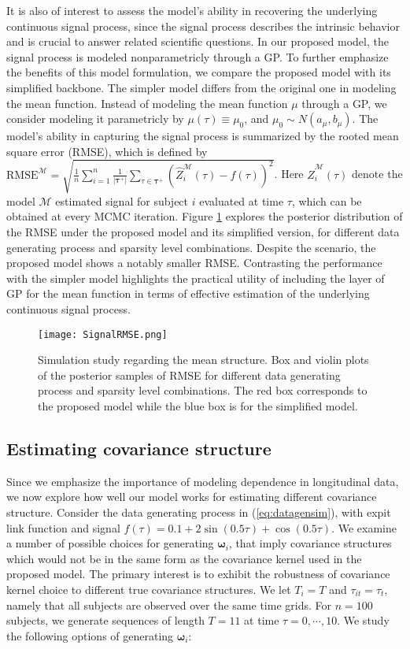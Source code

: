 It is also of interest to assess the model's ability in recovering the underlying continuous signal process, since the signal process describes the intrinsic behavior and is crucial to answer related scientific questions.  
In our proposed model, the signal process is modeled nonparametricly through a GP. To further emphasize the benefits of this model formulation, we compare the proposed model with its simplified backbone. The simpler model differs from the original one in modeling the mean function. Instead of modeling the mean function $\mu$ through a GP, we consider modeling it parametricly by $\mu(\tau)\equiv\mu_0$, and $\mu_0\sim N(a_{\mu},b_{\mu})$. The model's ability in capturing the signal process is summarized by the rooted mean square error (RMSE), which is defined by $\text{RMSE}^{\mathcal{M}}=\sqrt{\frac{1}{n}\sum_{i=1}^n\frac{1}{|\boldsymbol{\tau}^+|}\sum_{\tau\in\boldsymbol{\tau}^+}(\hat{Z}^{\mathcal{M}}_i(\tau)-f(\tau))^2}$. Here $\hat{Z}^{\mathcal{M}}_i(\tau)$ denote the model $\mathcal{M}$ estimated signal for subject $i$ evaluated at time $\tau$, which can be obtained at every MCMC iteration. Figure \ref{fig:signalRMSE} explores the posterior distribution of the RMSE under the proposed model and its simplified version, for different data generating process and sparsity level combinations. Despite the scenario, the proposed model shows a notably smaller RMSE. Contrasting the performance with the simpler model highlights the practical utility of including the layer of GP for the mean function in terms of effective estimation of the underlying continuous signal process.     

\begin{figure}[t!]
\centering
\texttt{[image: SignalRMSE.png]}
\caption{Simulation study regarding the mean structure. Box and violin plots of the posterior samples of RMSE for different data generating process and sparsity level combinations. The red box corresponds to the proposed model while the blue box is for the simplified model. }
\label{fig:signalRMSE}
\end{figure}


\subsection{Estimating covariance structure}
\label{subsec:simcov}

Since we emphasize the importance of modeling dependence in longitudinal data, we now explore how well our model works for estimating different covariance structure. Consider the data generating process in (\ref{eq:datagensim}), with expit link function and signal $f(\tau)=0.1+2\sin(0.5\tau)+\cos(0.5\tau)$. We examine a number of possible choices for generating $\boldsymbol{\omega}_i$, that imply covariance structures which would not be in the same form as the covariance kernel used in the proposed model. The primary interest is to exhibit the robustness of covariance kernel choice to different true covariance structures. We let $T_i=T$ and $\tau_{it}=\tau_t$, namely that all subjects are observed over the same time grids. For $n=100$ subjects, we generate sequences of length $T=11$ at time $\tau=0,\cdots,10$. We study the following options of generating $\boldsymbol{\omega}_i$:
         
